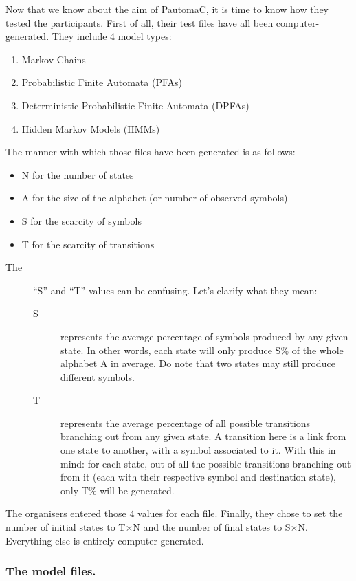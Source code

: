 \quad{}\enskip{}Now that we know about the aim of PautomaC, it is
time to know how they tested the participants. First of all, their
test files have all been computer-generated. They include 4 model
types:
\begin{enumerate}
\item Markov Chains
\item Probabilistic Finite Automata (PFAs)
\item Deterministic Probabilistic Finite Automata (DPFAs)
\item Hidden Markov Models (HMMs)
\end{enumerate}
The manner with which those files have been generated is as follows:
\begin{itemize}
\item N for the number of states
\item A for the size of the alphabet (or number of observed symbols)
\item S for the scarcity of symbols
\item T for the scarcity of transitions\end{itemize}
\begin{description}
\item [{\textmd{The}}] ``S'' and ``T'' values can be confusing. Let's
clarify what they mean:

\begin{description}
\item [{S}] represents the average percentage of symbols produced by any
given state. In other words, each state will only produce S\% of the
whole alphabet A in average. Do note that two states may still produce
different symbols.
\item [{T}] represents the average percentage of all possible transitions
branching out from any given state. A transition here is a link from
one state to another, with a symbol associated to it. With this in
mind: for each state, out of all the possible transitions branching
out from it (each with their respective symbol and destination state),
only T\% will be generated.
\end{description}
\end{description}
\enskip{}\enskip{}\enskip{}The organisers entered those 4 values
for each file. Finally, they chose to set the number of initial states
to T$\times$N and the number of final states to S$\times$N. Everything
else is entirely computer-generated. 


\subsubsection{The model files.}

